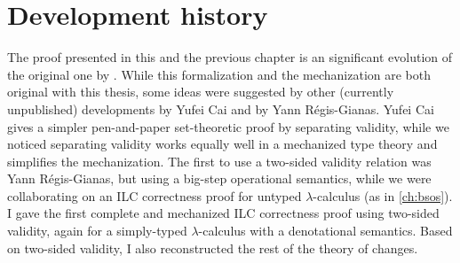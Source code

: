 




\section{Development history}
\label{sec:ilc-dev-history}
The proof presented in this and the previous chapter is an
significant evolution of the original one by \citet{CaiEtAl2014ILC}.
%
While this formalization and the mechanization are both original
with this thesis, some ideas were suggested by other
(currently unpublished) developments by Yufei Cai and by Yann
Régis-Gianas. Yufei Cai gives a simpler pen-and-paper set-theoretic proof by
separating validity, while we noticed separating validity works
equally well in a mechanized type theory and simplifies the
mechanization.
The first to use a two-sided validity relation was Yann Régis-Gianas, but using
a big-step operational semantics, while we were collaborating on an ILC
correctness proof for untyped $\lambda$-calculus (as in \cref{ch:bsos}).
I gave the first complete and mechanized ILC correctness proof
using two-sided validity, again for a simply-typed
$\lambda$-calculus with a denotational semantics. Based on
two-sided validity, I also reconstructed the rest of the theory
of changes.

